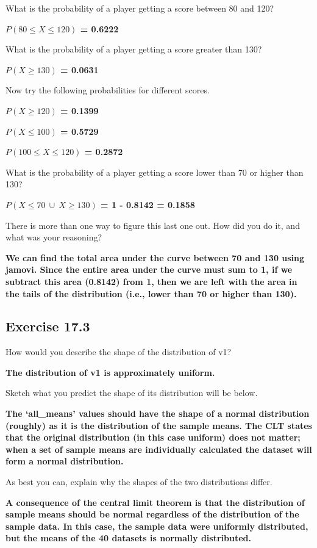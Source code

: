 \documentclass[
  openany]{scrbook}
\begin{document}
What is the probability of a player getting a score between 80 and 120?

\textbf{\(P(80 \leq X \leq 120)\) = 0.6222}

What is the probability of a player getting a score greater than 130?

\textbf{\(P(X \geq 130)\) = 0.0631}

Now try the following probabilities for different scores.

\textbf{\(P(X \geq 120)\) = 0.1399}

\textbf{\(P(X \leq 100)\) = 0.5729}

\textbf{\(P(100 \leq X \leq 120)\) = 0.2872}

What is the probability of a player getting a score lower than 70 or higher than 130?

\textbf{\(P(X \leq 70 \: \cup \: X \geq 130)\) = 1 - 0.8142 = 0.1858}

There is more than one way to figure this last one out. How did you do it, and what was your reasoning?

\textbf{We can find the total area under the curve between 70 and 130 using jamovi. Since the entire area under the curve must sum to 1, if we subtract this area (0.8142) from 1, then we are left with the area in the tails of the distribution (i.e., lower than 70 or higher than 130).}

\hypertarget{exercise-17.3}{%
\subsection{Exercise 17.3}\label{exercise-17.3}}

How would you describe the shape of the distribution of v1?

\textbf{The distribution of v1 is approximately uniform.}

Sketch what you predict the shape of its distribution will be below.

\textbf{The `all\_means' values should have the shape of a normal distribution (roughly) as it is the distribution of the sample means. The CLT states that the original distribution (in this case uniform) does not matter; when a set of sample means are individually calculated the dataset will form a normal distribution.}

As best you can, explain why the shapes of the two distributions differ.

\textbf{A consequence of the central limit theorem is that the distribution of sample means should be normal regardless of the distribution of the sample data. In this case, the sample data were uniformly distributed, but the means of the 40 datasets is normally distributed.}
\end{document}
